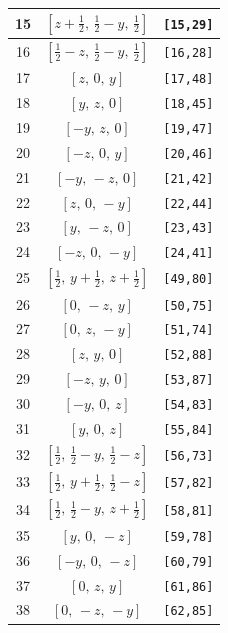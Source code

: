 \documentclass[fleqn,8pt]{jsarticle}
\begin{document}
\begin{longtable}{ccc}
15 & $\left[ z + \frac{1}{2},\, \frac{1}{2} - y,\, \frac{1}{2} \right]$ & {\tt [15,29]} \\ \hline
16 & $\left[ \frac{1}{2} - z,\, \frac{1}{2} - y,\, \frac{1}{2} \right]$ & {\tt [16,28]} \\ \hline
17 & $\left[ z,\, 0,\, y \right]$ & {\tt [17,48]} \\ \hline
18 & $\left[ y,\, z,\, 0 \right]$ & {\tt [18,45]} \\ \hline
19 & $\left[ - y,\, z,\, 0 \right]$ & {\tt [19,47]} \\ \hline
20 & $\left[ - z,\, 0,\, y \right]$ & {\tt [20,46]} \\ \hline
21 & $\left[ - y,\, - z,\, 0 \right]$ & {\tt [21,42]} \\ \hline
22 & $\left[ z,\, 0,\, - y \right]$ & {\tt [22,44]} \\ \hline
23 & $\left[ y,\, - z,\, 0 \right]$ & {\tt [23,43]} \\ \hline
24 & $\left[ - z,\, 0,\, - y \right]$ & {\tt [24,41]} \\ \hline
25 & $\left[ \frac{1}{2},\, y + \frac{1}{2},\, z + \frac{1}{2} \right]$ & {\tt [49,80]} \\ \hline
26 & $\left[ 0,\, - z,\, y \right]$ & {\tt [50,75]} \\ \hline
27 & $\left[ 0,\, z,\, - y \right]$ & {\tt [51,74]} \\ \hline
28 & $\left[ z,\, y,\, 0 \right]$ & {\tt [52,88]} \\ \hline
29 & $\left[ - z,\, y,\, 0 \right]$ & {\tt [53,87]} \\ \hline
30 & $\left[ - y,\, 0,\, z \right]$ & {\tt [54,83]} \\ \hline
31 & $\left[ y,\, 0,\, z \right]$ & {\tt [55,84]} \\ \hline
32 & $\left[ \frac{1}{2},\, \frac{1}{2} - y,\, \frac{1}{2} - z \right]$ & {\tt [56,73]} \\ \hline
33 & $\left[ \frac{1}{2},\, y + \frac{1}{2},\, \frac{1}{2} - z \right]$ & {\tt [57,82]} \\ \hline
34 & $\left[ \frac{1}{2},\, \frac{1}{2} - y,\, z + \frac{1}{2} \right]$ & {\tt [58,81]} \\ \hline
35 & $\left[ y,\, 0,\, - z \right]$ & {\tt [59,78]} \\ \hline
36 & $\left[ - y,\, 0,\, - z \right]$ & {\tt [60,79]} \\ \hline
37 & $\left[ 0,\, z,\, y \right]$ & {\tt [61,86]} \\ \hline
38 & $\left[ 0,\, - z,\, - y \right]$ & {\tt [62,85]} \\ \hline

\end{longtable}
\end{document}
